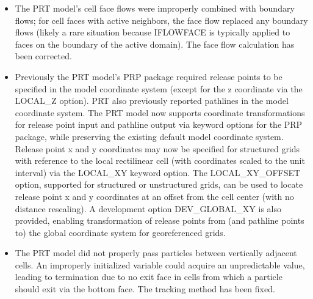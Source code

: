 \begin{itemize}
		\item The PRT model's cell face flows were improperly combined with boundary flows; for cell faces with active neighbors, the face flow replaced any boundary flows (likely a rare situation because IFLOWFACE is typically applied to faces on the boundary of the active domain). The face flow calculation has been corrected.
		\item Previously the PRT model's PRP package required release points to be specified in the model coordinate system (except for the z coordinate via the LOCAL\_Z option). PRT also previously reported pathlines in the model coordinate system. The PRT model now supports coordinate transformations for release point input and pathline output via keyword options for the PRP package, while preserving the existing default model coordinate system. Release point x and y coordinates may now be specified for structured grids with reference to the local rectilinear cell (with coordinates scaled to the unit interval) via the LOCAL\_XY keyword option. The LOCAL\_XY\_OFFSET option, supported for structured or unstructured grids, can be used to locate release point x and y coordinates at an offset from the cell center (with no distance rescaling). A development option DEV\_GLOBAL\_XY is also provided, enabling transformation of release points from (and pathline points to) the global coordinate system for georeferenced grids.
		\item The PRT model did not properly pass particles between vertically adjacent cells. An improperly initialized variable could acquire an unpredictable value, leading to termination due to no exit face in cells from which a particle should exit via the bottom face. The tracking method has been fixed.
	\end{itemize}



